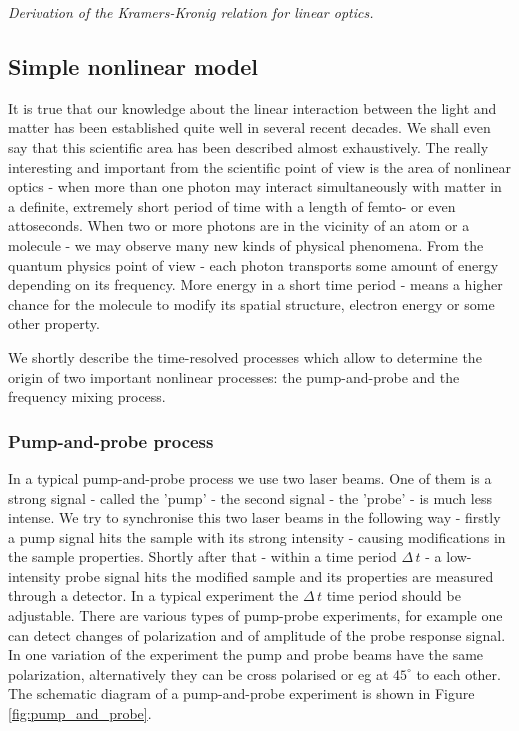 \documentclass[12pt,twoside,a4paper]{article}
\numberwithin{equation}{subsection}
\numberwithin{figure}{subsection}
\begin{document}
\textit{Derivation of the Kramers-Kronig relation for linear optics.}

\subsection{Simple nonlinear model} \label{chap:problem_nlo}

It is true that our knowledge about the linear interaction between the light and matter has been established quite well in several
recent decades. We shall even say that this scientific area has been described almost exhaustively. The really interesting and
important from the scientific point of view is the area of nonlinear optics - when more than one photon may interact simultaneously
with matter in a definite, extremely short period of time with a length of femto- or even attoseconds. When two or more photons
are in the vicinity of an atom or a molecule - we may observe many new kinds of physical phenomena. From the quantum physics point of view - each photon transports
some amount of energy depending on its frequency. More energy in a short time period - means a higher chance for the molecule to
modify its spatial structure, electron energy or some other property.

We shortly describe the time-resolved processes which allow to determine the origin of two important nonlinear processes: the pump-and-probe and
the frequency mixing process.

\subsubsection*{Pump-and-probe process}

In a typical pump-and-probe process we use two laser beams. One of them is a strong signal - called the 'pump' - the second signal
- the 'probe' - is much less intense. We try to synchronise this two laser beams in the following way - firstly a pump signal hits
the sample with its strong intensity - causing modifications in the sample properties. Shortly after that - within a time period
$\Delta \, t$ - a low-intensity probe signal hits the modified sample and its properties are measured through a detector. In a typical experiment the
$\Delta \, t$ time period should be adjustable. There are various types of pump-probe experiments, for example one can detect
changes of polarization and of amplitude of the probe response signal. In one variation of the experiment the pump and probe beams
have the same polarization, alternatively they can be cross polarised or eg at $45^{\circ}$ to each other. The schematic diagram of a
pump-and-probe experiment is shown in Figure \ref{fig:pump_and_probe}.
\end{document}
